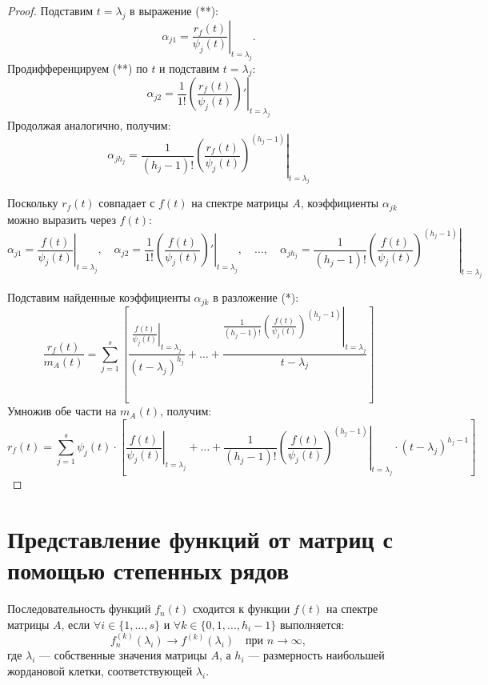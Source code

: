 \begin{proof}
       Подставим \( t = \lambda_j \) в выражение (**):
       \[
       \alpha_{j1} = \left. \frac{r_f(t)}{\psi_j(t)} \right|_{t = \lambda_j}.
       \]
       Продифференцируем (**) по \( t \) и подставим \( t = \lambda_j \):
       \[
       \alpha_{j2} = \frac{1}{1!} \left. \left( \frac{r_f(t)}{\psi_j(t)} \right)' \right|_{t = \lambda_j}
       \]
       Продолжая аналогично, получим:
       \[
       \alpha_{j h_j} = \frac{1}{(h_j - 1)!} \left. \left( \frac{r_f(t)}{\psi_j(t)} \right)^{(h_j - 1)} \right|_{t = \lambda_j}
       \]


       Поскольку \( r_f(t) \) совпадает с \( f(t) \) на спектре матрицы \( A \), коэффициенты \( \alpha_{jk} \) можно выразить через \( f(t) \):
       \[
       \alpha_{j1} = \left. \frac{f(t)}{\psi_j(t)} \right|_{t = \lambda_j}, \quad
       \alpha_{j2} = \frac{1}{1!} \left. \left( \frac{f(t)}{\psi_j(t)} \right)' \right|_{t = \lambda_j}, \quad \ldots, \quad
       \alpha_{j h_j} = \frac{1}{(h_j - 1)!} \left. \left( \frac{f(t)}{\psi_j(t)} \right)^{(h_j - 1)} \right|_{t = \lambda_j}
       \]


       Подставим найденные коэффициенты \( \alpha_{jk} \) в разложение (*):
       \[
       \frac{r_f(t)}{m_A(t)} = \sum_{j=1}^{s} \left[ \frac{\left. \frac{f(t)}{\psi_j(t)} \right|_{t = \lambda_j}}{(t - \lambda_j)^{h_j}} + \ldots + \frac{\frac{1}{(h_j - 1)!} \left. \left( \frac{f(t)}{\psi_j(t)} \right)^{(h_j - 1)} \right|_{t = \lambda_j}}{t - \lambda_j} \right]
       \]
       Умножив обе части на \( m_A(t) \), получим:
       \[
       r_f(t) = \sum_{j=1}^{s} \psi_j(t) \cdot \left[ \left. \frac{f(t)}{\psi_j(t)} \right|_{t = \lambda_j} + \ldots + \frac{1}{(h_j - 1)!} \left. \left( \frac{f(t)}{\psi_j(t)} \right)^{(h_j - 1)} \right|_{t = \lambda_j} \cdot (t - \lambda_j)^{h_j - 1} \right]
       \]

\end{proof}

\section{Представление функций от матриц с помощью степенных рядов}

\begin{shdef}
    \begin{definition}
    \leavevmode \nl 
    
    Последовательность функций \( f_n(t) \) сходится к функции \( f(t) \) на спектре матрицы \( A \), если \(\forall i \in \{1, \ldots, s\} \) и \(\forall k \in \{0, 1, \ldots, h_i - 1\} \) выполняется:
    \[
    f_n^{(k)}(\lambda_i) \to f^{(k)}(\lambda_i) \quad \text{при } n \to \infty,
    \]
    где \( \lambda_i \) — собственные значения матрицы \( A \), а \( h_i \) — размерность наибольшей \\жордановой клетки, соответствующей \( \lambda_i \).
    \end{definition}
\end{shdef}


